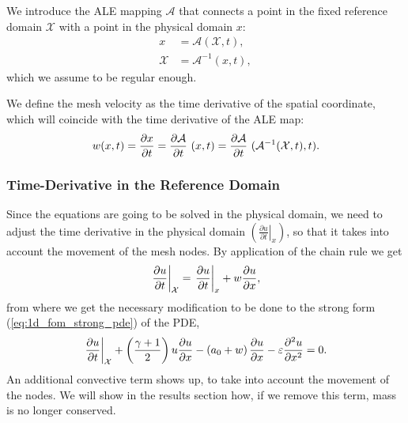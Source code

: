 \documentclass[../../thesis.tex]{subfiles}
\newcommand{\alemap}{\ensuremath{\mathcal{A}}}
\newcommand{\aleX}{\ensuremath{\mathcal{X}}}
\begin{document}
We introduce the ALE mapping $\alemap$ that connects a point in the fixed reference domain $\mathcal{X}$ with a point in the physical domain $x$:
\begin{subequations}
    \begin{align}
        x &= \alemap(\aleX, t), \\
        \aleX &= \alemap^{-1}(x, t),
    \end{align}
\end{subequations}
which we assume to be regular enough.

We define the mesh velocity as the time derivative of the spatial coordinate, which will coincide with the time derivative of the ALE map:
\begin{equation}
    w(x,t) = \pdv{x}{t} = \pdv{\alemap}{t} \ (x, t) = \pdv{\alemap}{t} \ (\alemap^{-1} (\aleX,t), t).
\end{equation}

\subsubsection*{Time-Derivative in the Reference Domain}
Since the equations are going to be solved in the physical domain, we need to adjust the time derivative in the physical domain 
$\left(\left.\frac{\partial u}{\partial t}\right|_{x}\right)$, 
so that it takes into account the movement of the mesh nodes.
By application of the chain rule we get
\begin{equation}
    \left.\frac{\partial u}{\partial t}\right|_{\aleX} = 
    \left.\frac{\partial u}{\partial t}\right|_{x} + w \pdv{u}{x},
\end{equation}
from where we get the necessary modification to be done to the strong form (\ref{eq:1d_fom_strong_pde}) of the PDE, 
\begin{equation}
    \left.\frac{\partial u}{\partial t}\right|_{\aleX} 
    + \left(\frac{\gamma+1}{2}\right) u \frac{\partial u}{\partial x} 
    - \left(a_0 + w\right)\frac{\partial u}{\partial x} 
    - \varepsilon \pdv[2]{u}{x} = 0.
\end{equation}
An additional convective term shows up, to take into account the movement of the nodes.
We will show in the results section how, if we remove this term, mass is no longer conserved.

\end{document}
